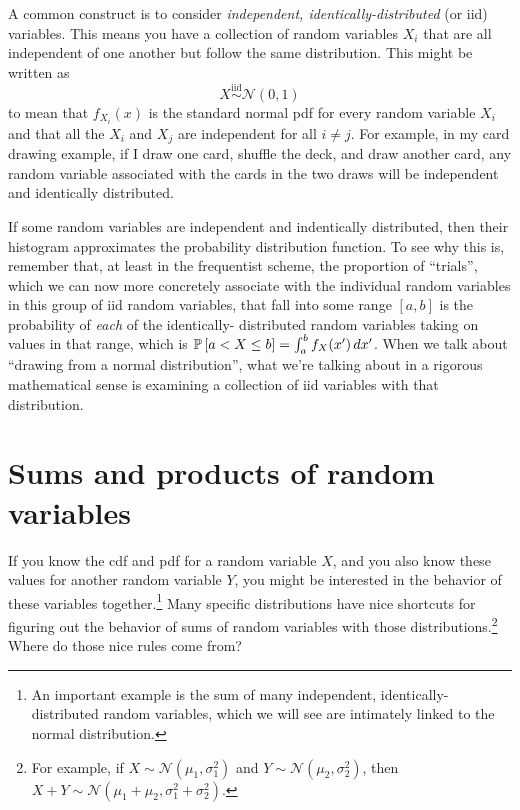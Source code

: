 A common construct is to consider \emph{independent, identically-distributed}
(or iid) variables. This means you have a collection of random variables $X_i$
that are all independent of one another but follow the same distribution. This
might be written as
\begin{equation*}
X \stackrel{\text{iid}}{\sim} \mathcal{N}(0, 1)
\end{equation*}
to mean that $f_{X_i}(x)$ is the standard normal pdf for every random variable
$X_i$ and that all the $X_i$ and $X_j$ are independent for all $i \neq j$. For
example, in my card drawing example, if I draw one card, shuffle the deck, and
draw another card, any random variable associated with the cards in the two
draws will be independent and identically distributed.

If some random variables are independent and indentically distributed, then
their histogram approximates the probability distribution function. To see why
this is, remember that, at least in the frequentist scheme, the proportion of
``trials'', which we can now more concretely associate with the individual
random variables in this group of iid random variables, that fall into some
range $[a, b]$ is the probability of \emph{each} of the identically-
distributed random variables taking on values in that range, which is $\mathbb{P}\left[{a
< X \leq b}\right] = \int_a^b f_X(x') \,dx'$. When we talk about ``drawing from a
normal distribution'', what we're talking about in a rigorous mathematical
sense is examining a collection of iid variables with that distribution.

\section{Sums and products of random variables}

If you know the cdf and pdf for a random variable $X$, and you also know these
values for another random variable $Y$, you might be interested in the
behavior of these variables together.\footnote{An important example is the sum
of many independent, identically-distributed random variables, which we will
see are intimately linked to the normal distribution.} Many specific
distributions have nice shortcuts for figuring out the behavior of sums of
random variables with those distributions.\footnote{For example, if $X \sim
\mathcal{N}(\mu_1, \sigma_1^2)$ and $Y \sim \mathcal{N}(\mu_2, \sigma_2^2)$,
then $X + Y \sim \mathcal{N}(\mu_1 + \mu_2, \sigma_1^2 + \sigma_2^2)$.} Where
do those nice rules come from?

